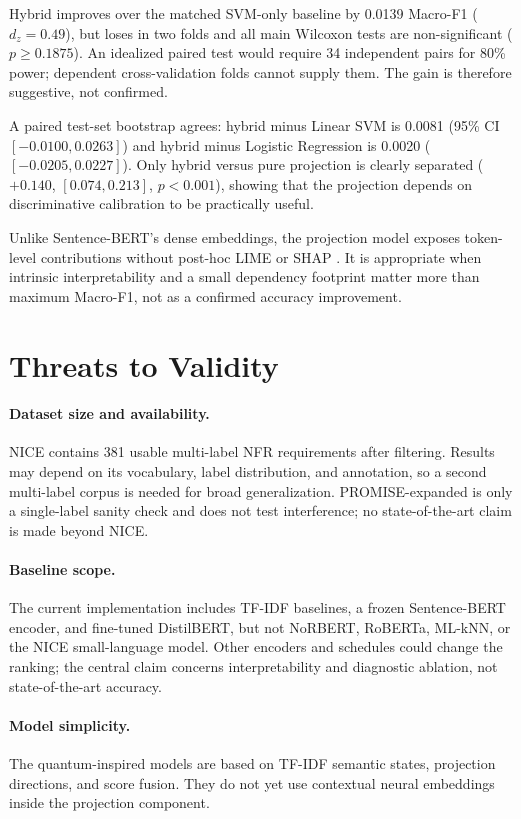 \documentclass[runningheads]{llncs}
\begin{document}
Hybrid improves over the matched SVM-only baseline by 0.0139 Macro-F1
($d_z=0.49$), but loses in two folds and all main Wilcoxon tests are
non-significant ($p\geq0.1875$). An idealized paired test would require 34
independent pairs for 80\% power; dependent cross-validation folds cannot
supply them. The gain is therefore suggestive, not confirmed.

A paired test-set bootstrap agrees: hybrid minus Linear SVM is 0.0081
(95\% CI $[-0.0100,0.0263]$) and hybrid minus Logistic Regression is 0.0020
($[-0.0205,0.0227]$). Only hybrid versus pure projection is clearly separated
($+0.140$, $[0.074,0.213]$, $p<0.001$), showing that the projection depends on
discriminative calibration to be practically useful.

Unlike Sentence-BERT's dense embeddings, the projection model exposes
token-level contributions without post-hoc LIME \cite{ribeiro2016lime} or SHAP
\cite{lundberg2017shap}. It is appropriate when intrinsic interpretability and
a small dependency footprint matter more than maximum Macro-F1, not as a
confirmed accuracy improvement.

\section{Threats to Validity}
\paragraph{Dataset size and availability.} NICE contains 381 usable multi-label
NFR requirements after filtering. Results may depend on its vocabulary, label
distribution, and annotation, so a second multi-label corpus is needed for
broad generalization. PROMISE-expanded is only a single-label sanity check and
does not test interference; no state-of-the-art claim is made beyond NICE.

\paragraph{Baseline scope.} The current implementation includes TF-IDF baselines,
a frozen Sentence-BERT encoder, and fine-tuned DistilBERT, but not NoRBERT,
RoBERTa, ML-kNN, or the NICE small-language model. Other encoders and schedules
could change the ranking; the central claim concerns interpretability and
diagnostic ablation, not state-of-the-art accuracy.

\paragraph{Model simplicity.} The quantum-inspired models are based on TF-IDF
semantic states, projection directions, and score fusion. They do not yet use
contextual neural embeddings inside the projection component.
\end{document}
